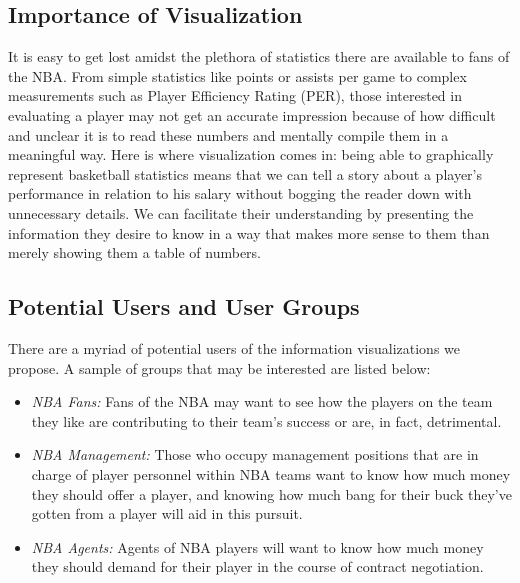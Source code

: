 \documentclass[journal]{vgtc}                %
\begin{document}
\subsection{Importance of Visualization}
It is easy to get lost amidst the plethora of statistics there are available to fans of the NBA. From simple statistics like points or assists per game to complex measurements such as Player Efficiency Rating (PER), those interested in evaluating a player may not get an accurate impression because of how difficult and unclear it is to read these numbers and mentally compile them in a meaningful way. Here is where visualization comes in: being able to graphically represent basketball statistics means that we can tell a story about a player's performance in relation to his salary without bogging the reader down with unnecessary details. We can facilitate their understanding by presenting the information they desire to know in a way that makes more sense to them than merely showing them a table of numbers.  

\subsection{Potential Users and User Groups}
There are a myriad of potential users of the information visualizations we propose. A sample of groups that may be interested are listed below:
\begin{itemize}
\item \emph{NBA Fans: } Fans of the NBA may want to see how the players on the team they like are contributing to their team's success or are, in fact, detrimental.
\item \emph{NBA Management: } Those who occupy management positions that are in charge of player personnel within NBA teams want to know how much money they should offer a player, and knowing how much bang for their buck they've gotten from a player will aid in this pursuit.
\item \emph{NBA Agents: } Agents of NBA players will want to know how much money they should demand for their player in the course of contract negotiation.
\end{itemize}
\end{document}
